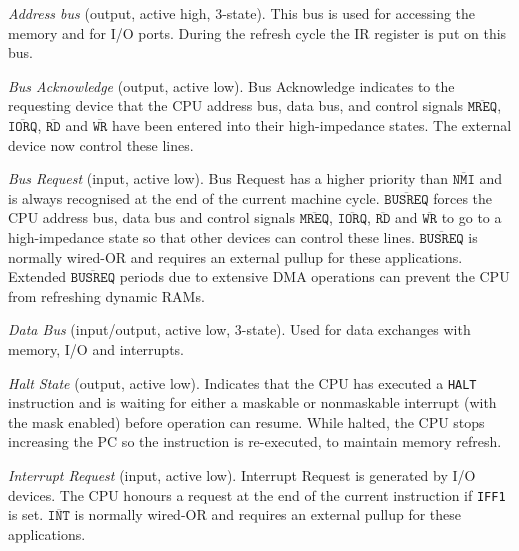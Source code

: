 \begin{description}[leftmargin=1.5em]

	\item[$\mathtt{\overline{A_{15}}-\overline{A_0}}$] 
	{\em Address bus} (output, active high, 3-state). This bus is used for accessing the memory and for I/O ports. During the refresh cycle the IR register is put on this bus.

	\item[$\mathtt{\overline{BUSACK}}$]
	{\em Bus Acknowledge} (output, active low). Bus Acknowledge indicates to the requesting device that the CPU address bus, data bus, and control signals $\mathtt{\overline{MREQ}}$, $\mathtt{\overline{IORQ}}$, $\mathtt{\overline{RD}}$ and $\mathtt{\overline{WR}}$ have been entered into their high-impedance states. The external device now control these lines.

	\item[$\mathtt{\overline{BUSREQ}}$]
	{\em Bus Request} (input, active low). Bus Request has a higher priority than $\mathtt{\overline{NMI}}$ and is always recognised at the end of the current machine cycle. $\mathtt{\overline{BUSREQ}}$ forces the CPU address bus, data bus and control signals $\mathtt{\overline{MREQ}}$, $\mathtt{\overline{IORQ}}$, $\mathtt{\overline{RD}}$ and $\mathtt{\overline{WR}}$ to go to a high-impedance state so that other devices can control these lines. $\mathtt{\overline{BUSREQ}}$ is normally wired-OR and requires an external pullup for these applications. Extended $\mathtt{\overline{BUSREQ}}$ periods due to extensive DMA operations can prevent the CPU from refreshing dynamic RAMs.

	\item[$\mathtt{\overline{D_7}-\overline{D_0}}$]
	{\em Data Bus} (input/output, active low, 3-state). Used for data exchanges with memory, I/O and interrupts.

	\item[$\mathtt{\overline{HALT}}$]
	{\em Halt State} (output, active low). Indicates that the CPU has executed a {\tt HALT} instruction and is waiting for either a maskable or nonmaskable interrupt (with the mask enabled) before operation can resume. While halted, the CPU stops increasing the PC so the instruction is re-executed, to maintain memory refresh.

	\item[$\mathtt{\overline{INT}}$]
	{\em Interrupt Request} (input, active low). Interrupt Request is generated by I/O devices. The CPU honours a request at the end of the current instruction if {\tt IFF1} is set. $\mathtt{\overline{INT}}$ is normally wired-OR and requires an external pullup for these applications.


\end{description}
